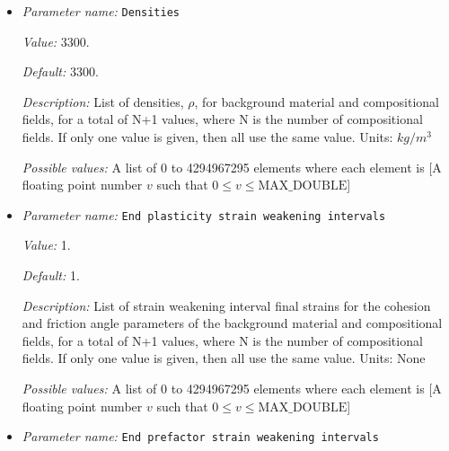 \begin{itemize}
{\it Default:} 1e20


{\it Description:} List of cohesions, $C$, for background material and compositional fields, for a total of N+1 values, where N is the number of compositional fields. The extremely large default cohesion value (1e20 Pa) prevents the viscous stress from exceeding the yield stress. Units: $Pa$.


{\it Possible values:} A list of 0 to 4294967295 elements where each element is [A floating point number $v$ such that $0 \leq v \leq \text{MAX\_DOUBLE}$]
\item {\it Parameter name:} {\tt Densities}
\label{parameters:Material model/Visco Plastic/Densities}
\label{parameters:Material_20model/Visco_20Plastic/Densities}


{\it Value:} 3300.


{\it Default:} 3300.


{\it Description:} List of densities, $\rho$, for background material and compositional fields, for a total of N+1 values, where N is the number of compositional fields. If only one value is given, then all use the same value.  Units: $kg / m^3$


{\it Possible values:} A list of 0 to 4294967295 elements where each element is [A floating point number $v$ such that $0 \leq v \leq \text{MAX\_DOUBLE}$]
\item {\it Parameter name:} {\tt End plasticity strain weakening intervals}
\label{parameters:Material model/Visco Plastic/End plasticity strain weakening intervals}
\label{parameters:Material_20model/Visco_20Plastic/End_20plasticity_20strain_20weakening_20intervals}


{\it Value:} 1.


{\it Default:} 1.


{\it Description:} List of strain weakening interval final strains for the cohesion and friction angle parameters of the background material and compositional fields, for a total of N+1 values, where N is the number of compositional fields. If only one value is given, then all use the same value.  Units: None


{\it Possible values:} A list of 0 to 4294967295 elements where each element is [A floating point number $v$ such that $0 \leq v \leq \text{MAX\_DOUBLE}$]
\item {\it Parameter name:} {\tt End prefactor strain weakening intervals}
\label{parameters:Material model/Visco Plastic/End prefactor strain weakening intervals}
\label{parameters:Material_20model/Visco_20Plastic/End_20prefactor_20strain_20weakening_20intervals}



\end{itemize}
